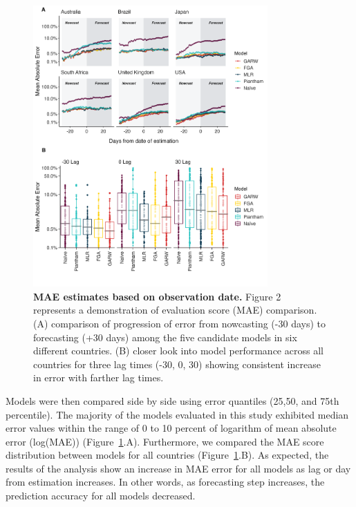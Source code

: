 \documentclass[11pt,oneside,letterpaper]{article}
\begin{document}
\begin{figure}[H]
	\centering
	\includegraphics[width=0.8\textwidth]{figures/model_comp.png}
	\caption{\textbf{MAE estimates based on observation date.}
	Figure 2 represents a demonstration of evaluation score (MAE) comparison. 
	(A) comparison of progression of error from nowcasting (-30 days) to forecasting (+30 days) among the five candidate models in six different countries.
	(B) closer look into model performance across all countries for three lag times (-30, 0, 30) showing consistent increase in error with farther lag times. 
	}
	\label{fig:model_comp_fig}
\end{figure}


Models were then compared side by side using error quantiles (25,50, and 75th percentile).
The majority of the models evaluated in this study exhibited median error values within the range of 0 to 10 percent of logarithm of mean absolute error (log(MAE)) (Figure~\ref{fig:model_comp_fig}.A).
Furthermore, we compared the MAE score distribution between models for all countries (Figure~\ref{fig:model_comp_fig}.B).
As expected, the results of the analysis show an increase in MAE error for all models as lag or day from estimation increases. 
In other words, as forecasting step increases, the prediction accuracy for all models decreased.
\end{document}
